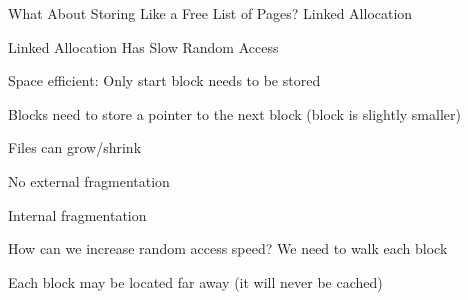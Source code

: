 \begin{frame}{What About Storing Like a Free List of Pages? Linked Allocation}
\begin{center}
    \end{center}
  \end{frame}

  \begin{frame}{Linked Allocation Has Slow Random Access}
    
    Space efficient: Only start block needs to be stored

    \hspace{2em} Blocks need to store a pointer to the next block (block is slightly smaller)

    \vspace{2em}

    Files can grow/shrink

    \hspace{2em} No external fragmentation

    \hspace{2em} Internal fragmentation

    \vspace{2em}

    How can we increase random access speed? We need to walk each block

    \hspace{2em} Each block may be located far away (it will never be cached)

  \end{frame}


